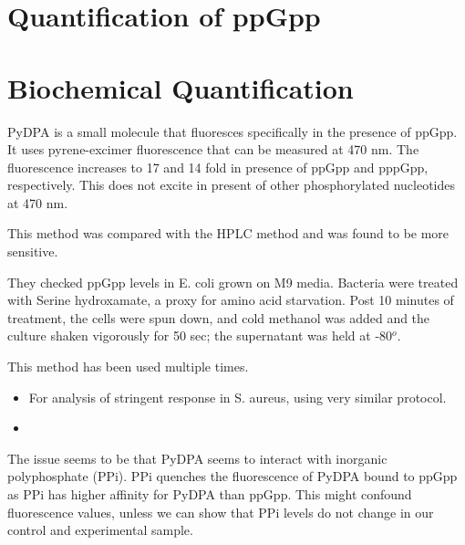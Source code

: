 \section{Quantification of ppGpp}

\section{Biochemical Quantification}

PyDPA is a small molecule that fluoresces specifically in the presence of ppGpp.
It uses pyrene-excimer fluorescence that can be measured at 470 nm. 
The fluorescence increases to 17 and 14 fold in presence of ppGpp and pppGpp, respectively.
This does not excite in present of other phosphorylated nucleotides at 470 nm.

This method was compared with the HPLC method and was found to be more sensitive. 

They checked ppGpp levels in E. coli grown on M9 media. Bacteria were treated with Serine hydroxamate, a proxy for amino acid starvation. 
Post 10 minutes of treatment, the cells were spun down, and cold methanol was added and the culture shaken vigorously for 50 sec; the supernatant was held at -80$^o$.

This method has been used multiple times. 

\begin{itemize}
	\item For analysis of stringent response in S. aureus, using very similar protocol.
	\item
\end{itemize}

The issue seems to be that PyDPA seems to interact with inorganic polyphosphate (PPi).
PPi quenches the fluorescence of PyDPA bound to ppGpp as PPi has higher affinity for PyDPA than ppGpp.
This might confound fluorescence values, unless we can show that PPi levels do not change in our control and experimental sample. 
